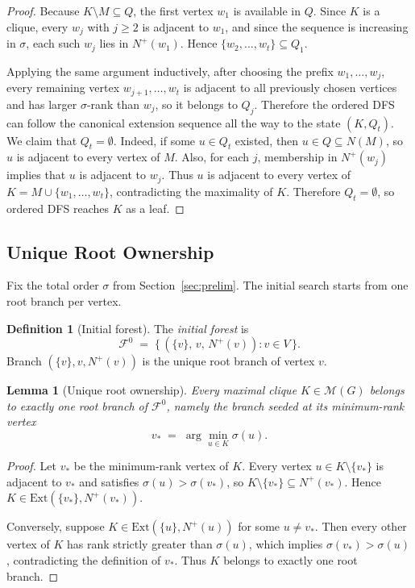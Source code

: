 \documentclass[sigconf, nonacm]{acmart}
\newtheorem{lemma}[theorem]{Lemma}
\theoremstyle{definition}
\newtheorem{definition}[theorem]{Definition}
\theoremstyle{remark}
\begin{document}
\begin{proof}
Because $K \setminus M \subseteq Q$, the first vertex $w_1$ is available in
$Q$.  Since $K$ is a clique, every $w_j$ with $j \ge 2$ is adjacent to $w_1$,
and since the sequence is increasing in $\sigma$, each such $w_j$ lies in
$N^+(w_1)$.  Hence $\{w_2,\ldots,w_t\} \subseteq Q_1$.

Applying the same argument inductively, after choosing the prefix
$w_1,\ldots,w_j$, every remaining vertex
$w_{j+1},\ldots,w_t$ is adjacent to all previously chosen vertices and has
larger $\sigma$-rank than $w_j$, so it belongs to $Q_j$.  Therefore the
ordered DFS can follow the canonical extension sequence all the way to the
state $(K,Q_t)$.  We claim that $Q_t = \emptyset$.  Indeed, if some
$u \in Q_t$ existed, then $u \in Q \subseteq N(M)$, so $u$ is adjacent to every
vertex of $M$.  Also, for each $j$, membership in $N^+(w_j)$ implies that $u$
is adjacent to $w_j$.  Thus $u$ is adjacent to every vertex of
$K = M \cup \{w_1,\ldots,w_t\}$, contradicting the maximality of $K$.
Therefore $Q_t = \emptyset$, so ordered DFS reaches $K$ as a leaf.
\end{proof}

\subsection{Unique Root Ownership}

Fix the total order $\sigma$ from Section~\ref{sec:prelim}.  The initial search
starts from one root branch per vertex.

\begin{definition}[Initial forest]\label{def:forest0}
The \emph{initial forest} is
\[
  \mathcal{F}^0
  \;=\;
  \bigl\{\, (\{v\},\, v,\, N^+(v)) : v \in V \,\bigr\}.
\]
Branch $(\{v\}, v, N^+(v))$ is the unique root branch of vertex $v$.
\end{definition}

\begin{lemma}[Unique root ownership]\label{lem:partition}
Every maximal clique $K \in \mathcal{M}(G)$ belongs to exactly one root branch
of $\mathcal{F}^0$, namely the branch seeded at its minimum-rank vertex
\[
  v_* \;=\; \arg\min_{u \in K} \sigma(u).
\]
\end{lemma}

\begin{proof}
Let $v_*$ be the minimum-rank vertex of $K$.  Every vertex
$u \in K \setminus \{v_*\}$ is adjacent to $v_*$ and satisfies
$\sigma(u) > \sigma(v_*)$, so
$K \setminus \{v_*\} \subseteq N^+(v_*)$.  Hence
$K \in \mathrm{Ext}(\{v_*\}, N^+(v_*))$.

Conversely, suppose
$K \in \mathrm{Ext}(\{u\}, N^+(u))$ for some $u \ne v_*$.  Then every other
vertex of $K$ has rank strictly greater than $\sigma(u)$, which implies
$\sigma(v_*) > \sigma(u)$, contradicting the definition of $v_*$.  Thus $K$
belongs to exactly one root branch.
\end{proof}
\end{document}
